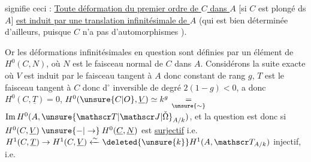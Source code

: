 
signifie ceci :  \uline{Toute déformation  du premier ordre de $C$ dans $A$} [si $C$ est plongé  ds $A$] \uline{est induit par une translation infinitésimale de $A$} (qui est bien déterminée d'ailleurs, puisque $C$ n'a pas d'automorphismes ).

Or  les déformations infinitésimales en question sont définies par un élément de $H^0(C,N)$, où $N$ est le faisceau normal de $C$ dans $A$. Considérons la suite exacte
où $V$ est induit par le faisceau tangent à $A$ donc constant de rang $g$, $T$ est le faisceau tangent à $C$ donc d$^\circ$ inversible de degré $2(1-g)<0$,   a donc $H^0(C,\underline T)=0$, $H^0(\unsure{C|O},\underline V)\simeq k^g$ $\underset{\unsure{\sim}}{=}$  $\mathrm{Im}\,H^0(A,\unsure{\mathscr T|\mathscr J|\check{\Omega}}_{A/k})$, et la question est donc  si $H^0(C,\underline V)\mathbin{\unsure{-|\to}}H^0(\underline C,\underline N)$ est \uline{surjectif} i.e. $H^1(C,\underline T)\to H^1(C,\underline V)\xleftarrow{\sim}\deleted{\unsure{k}}H^1(A,\mathscr T_{A/k})$ injectif, i.e.

